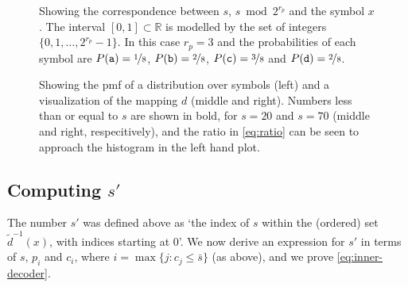 \documentclass{article}
\begin{document}
\begin{figure}[ht]
  \centering
  \drawinterval
  \caption{
    Showing the correspondence between \(s\), \(s \bmod 2^{r_p}\) and the
    symbol \(x\). The interval \([0, 1]\subset\mathbb{R}\) is modelled by the
    set of integers \(\{0, 1, \ldots, 2^{r_p} - 1\}\). In this case \(r_p = 3\)
    and the probabilities of each symbol are \(P(\mathtt a) =
    \nicefrac{1}{8}\), \(P(\mathtt b) = \nicefrac{2}{8}\), \(P(\mathtt c) =
    \nicefrac{3}{8}\) and \(P(\mathtt d) = \nicefrac{2}{8}\).}
  \label{fig:interval}
\end{figure}

\begin{figure}[ht]
  \centering
  \drawpmf \quad {} \quad {}
  \caption{
    Showing the pmf of a distribution over symbols (left) and a visualization
    of the mapping \(d\) (middle and right).  Numbers less than or equal to
    \(s\) are shown in bold, for \(s=20\) and \(s=70\) (middle and right,
    respecitively), and the ratio in \cref{eq:ratio} can be seen to approach
    the histogram in the left hand plot.
  }\label{fig:visual-ans}
\end{figure}

\subsection{Computing \(s'\)}
The number \(s'\) was defined above as `the index of \(s\) within the (ordered)
set \(\tilde d^{-1}(x)\), with indices starting at \(0\)'. We now derive an
expression for \(s'\) in terms of \(s\), \(p_i\) and \(c_i\), where \(i =
\max\{j: c_j \leq \bar s\}\) (as above), and we prove \cref{eq:inner-decoder}.
\end{document}
